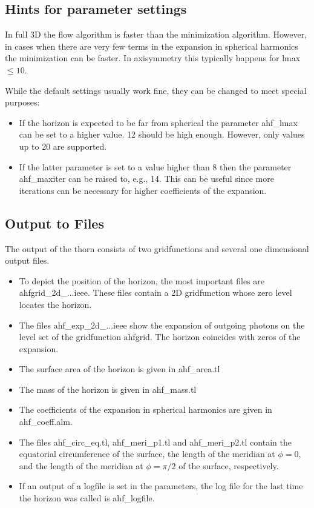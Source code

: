 \subsection{Hints for parameter settings}
In full 3D the flow algorithm is faster than the minimization algorithm.
However, in cases when there are very few terms in the expansion in
spherical harmonics the minimization can be faster. In axisymmetry this
typically happens for lmax$\leq 10$.

While the default settings usually work fine, they can be changed to meet
special purposes:
\begin{itemize}
\item If the horizon is expected to be far from spherical the parameter
    ahf\_lmax can be set to a higher value. 12 should be high enough.
    However, only values up to 20 are supported.
\item If the latter parameter is set to a value higher than 8 then the
    parameter ahf\_maxiter can be raised to, e.g., 14. This can be useful
    since more iterations can be necessary for higher coefficients of the
    expansion.
\end{itemize}
\subsection{Output to Files}
The output of the thorn consists of two gridfunctions and several one
dimensional output files.
\begin{itemize}
\item To depict the position of the horizon, the most important files are
    ahfgrid\_2d\_...ieee. These files contain a 2D gridfunction whose zero
    level locates the horizon.
\item The files ahf\_exp\_2d\_...ieee show the expansion of outgoing photons
    on the level set of the gridfunction ahfgrid. The horizon coincides
    with zeros of the expansion.
\item The surface area of the horizon is given in ahf\_area.tl
\item The mass of the horizon is given in ahf\_mass.tl
\item The coefficients of the expansion in spherical harmonics are given in
    ahf\_coeff.alm.
\item The files ahf\_circ\_eq.tl, ahf\_meri\_p1.tl and ahf\_meri\_p2.tl contain
    the equatorial circumference of the surface, the length of the
    meridian at $\phi=0$, and the length of the meridian at $\phi=\pi/2$ of the
    surface, respectively.
\item If an output of a logfile is set in the parameters, the log file for
    the last time the horizon was called is ahf\_logfile.

\end{itemize}
